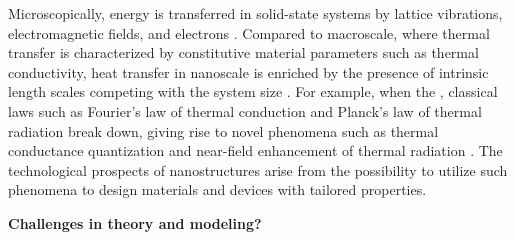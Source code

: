 Microscopically, energy is transferred in solid-state systems by lattice vibrations, electromagnetic fields, and electrons \cite{chen}. Compared to macroscale, where thermal transfer is characterized by constitutive material parameters such as thermal conductivity, heat transfer in nanoscale is enriched by the presence of intrinsic length scales competing with the system size \cite{chen}. For example, when the , classical laws such as Fourier's law of thermal conduction \cite{fourier} and Planck's law of thermal radiation \cite{planck00a} break down, giving rise to novel phenomena such as thermal conductance quantization \cite{rego98,angelescu98,schwab00} and near-field enhancement of thermal radiation \cite{volokitin07}. The technological prospects of nanostructures arise from the possibility to utilize such phenomena to design materials and devices with tailored properties. %


\textbf{Challenges in theory and modeling?}
 


